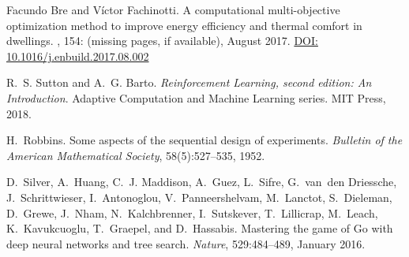 \documentclass[12pt,a4paper]{book}
\begin{document}
\begin{thebibliography}{X}
    Facundo Bre and Víctor Fachinotti.
    \newblock A computational multi-objective optimization method to improve energy efficiency and thermal comfort in dwellings.
    , 154: (missing pages, if available), August 2017.
    \newblock \href{https://doi.org/10.1016/j.enbuild.2017.08.002}{DOI: 10.1016/j.enbuild.2017.08.002}
    
    R.~S. Sutton and A.~G. Barto.
    \newblock \textit{Reinforcement Learning, second edition: An Introduction}.
    \newblock Adaptive Computation and Machine Learning series. MIT Press, 2018.

    H.~Robbins.
    \newblock Some aspects of the sequential design of experiments.
    \newblock \textit{Bulletin of the American Mathematical Society}, 58(5):527--535, 1952.
        
    D.~Silver, A.~Huang, C.~J. Maddison, A.~Guez, L.~Sifre, G.~van~den Driessche, J.~Schrittwieser, I.~Antonoglou, V.~Panneershelvam, M.~Lanctot, S.~Dieleman, D.~Grewe, J.~Nham, N.~Kalchbrenner, I.~Sutskever, T.~Lillicrap, M.~Leach, K.~Kavukcuoglu, T.~Graepel, and D.~Hassabis.
    \newblock Mastering the game of Go with deep neural networks and tree search.
    \newblock \textit{Nature}, 529:484--489, January 2016.


\end{thebibliography}
\end{document}

